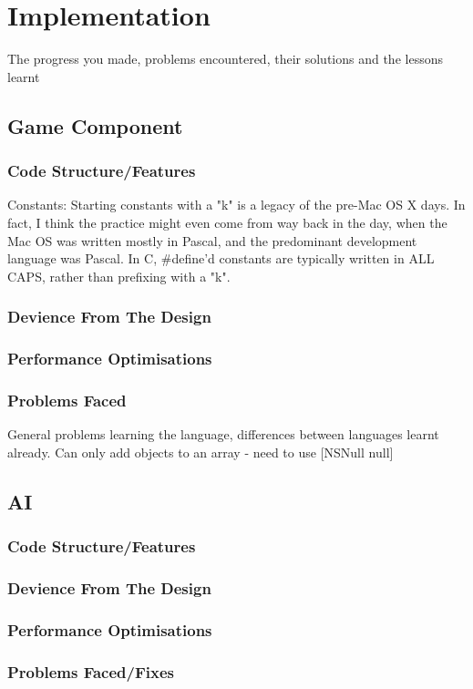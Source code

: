 \documentclass[runningheads,a4paper]{llncs}
\begin{document}
\section{Implementation}
The progress you made, problems encountered, their solutions and the lessons learnt

	\subsection{Game Component}
		\subsubsection{Code Structure/Features}
			Constants: Starting constants with a "k" is a legacy of the pre-Mac OS X days. In fact, I think the practice might even come from way back in the day, when the Mac OS was written mostly in Pascal, and the predominant development language was Pascal. In C, \#define'd constants are typically written in ALL CAPS, rather than prefixing with a "k".
		\subsubsection{Devience From The Design}
		\subsubsection{Performance Optimisations}
		\subsubsection{Problems Faced} General problems learning the language, differences between languages learnt already. Can only add objects to an array - need to use [NSNull null]
	\subsection{AI}
		\subsubsection{Code Structure/Features}
		\subsubsection{Devience From The Design}
		\subsubsection{Performance Optimisations}
		\subsubsection{Problems Faced/Fixes}
	
\end{document}
